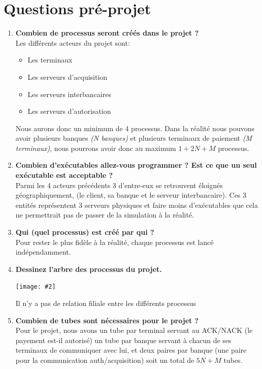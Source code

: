 \documentclass[french, a4paper, 12pt, titlepage]{article}
\newcommand{\graph}[2]{
\medskip
	\begin{center}
		\texttt{[image: \#2]}
	\end{center}
\medskip
}
\begin{document}
\section{Questions pré-projet}
\begin{enumerate}
\item \textbf{Combien de processus seront créés dans le projet ?}\\
Les différents acteurs du projet sont: \begin{itemize}
\item Les terminaux
\item Les serveurs d'acquisition
\item Les serveurs interbancaires
\item Les serveurs d'autorisation
\end{itemize}
Nous aurons donc un minimum de 4 processus.
Dans la réalité nous pouvons avoir plusieurs banques \textit{(N banques)} et plusieurs terminaux de paiement \textit{(M terminaux)}, nous pourrons avoir donc au maximum $1+2N+M$ processus.\\

\item \textbf{Combien d'exécutables allez-vous programmer ? Est ce que un seul exécutable est acceptable ?}\\
Parmi les 4 acteurs précédents 3 d'entre-eux se retrouvent éloignés géographiquement, (le client, sa banque et le serveur interbancaire).
Ces 3 entités représentent 3 serveurs physiques et faire moins d'exécutables que cela ne permettrait pas de passer de la simulation à la réalité.\\

\item \textbf{Qui (quel processus) est créé par qui ?}\\
Pour rester le plus fidèle à la réalité, chaque processus est lancé indépendamment.\\

\item \textbf{Dessinez l'arbre des processus du projet.}
\smallskip
\begin{center}
\graph{0.3}{fork}
\end{center}
Il n'y a pas de relation filiale entre les différents processus\\

\item \textbf{Combien de tubes sont nécessaires pour le projet ?}\\
Pour le projet, nous avons un tube par terminal servant au ACK/NACK (le payement est-il autorisé) un tube par banque servant à chacun de ses terminaux de communiquer avec lui, et deux paires par banque (une paire pour la communication auth/acquisition) soit un total de $5N+M$ tubes.\\


\end{enumerate}
\end{document}
